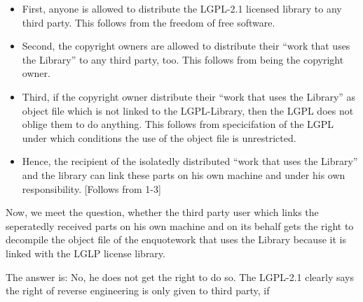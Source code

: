 \begin{itemize}
\item First, anyone is allowed to distribute the LGPL-2.1 licensed library to
any third party. This follows from the freedom of free software.

\item Second, the copyright owners are allowed to distribute their \enquote{work
that uses the Library} to any third party, too. This follows from being the copyright
owner.

\item Third, if the copyright owner distribute their \enquote{work that
uses the Library} as object file which is not linked to the LGPL-Library, then
the LGPL does not oblige them to do anything. This follows from specicifation of
the LGPL under which conditions the use of the object file is unrestricted.

\item Hence, the recipient of the isolatedly distributed \enquote{work
that uses the Library} and the library can link these parts on his own machine
and under his own responsibility. [Follows from 1-3]
\end{itemize}

Now, we meet the question, whether the third party user which links the
seperatedly received parts on his own machine and on its behalf gets the right
to decompile the object file of the enquote{work that uses the Library} because it
is linked with the LGLP license library.

The answer is: No, he does not get the right to do so. The LGPL-2.1 clearly says
the right of reverse engineering is only given to third party, if 

%

